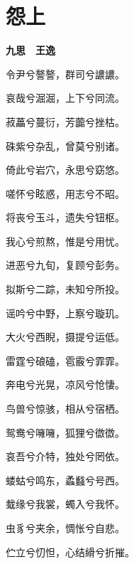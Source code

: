 \documentclass[12pt,a4paper]{ctexbook}
\begin{document}
\section{怨上}
\textbf{九思　王逸}\par\vspace{0.5em}
令尹兮謷謷，群司兮譨譨。\par
哀哉兮淈淈，上下兮同流。\par
菽藟兮蔓衍，芳虈兮挫枯。\par
硃紫兮杂乱，曾莫兮别诸。\par
倚此兮岩穴，永思兮窈悠。\par
嗟怀兮眩惑，用志兮不昭。\par
将丧兮玉斗，遗失兮钮枢。\par
我心兮煎熬，惟是兮用忧。\par
进恶兮九旬，复顾兮彭务。\par
拟斯兮二踪，未知兮所投。\par
谣吟兮中野，上察兮璇玑。\par
大火兮西睨，摄提兮运低。\par
雷霆兮硠磕，雹霰兮霏霏。\par
奔电兮光晃，凉风兮怆悽。\par
鸟兽兮惊骇，相从兮宿栖。\par
鸳鸯兮噰噰，狐狸兮徾徾。\par
哀吾兮介特，独处兮罔依。\par
蝼蛄兮鸣东，蟊蠽兮号西。\par
蛓缘兮我裳，蠋入兮我怀。\par
虫豸兮夹余，惆怅兮自悲。\par
伫立兮忉怛，心结縎兮折摧。\par
\end{document}

